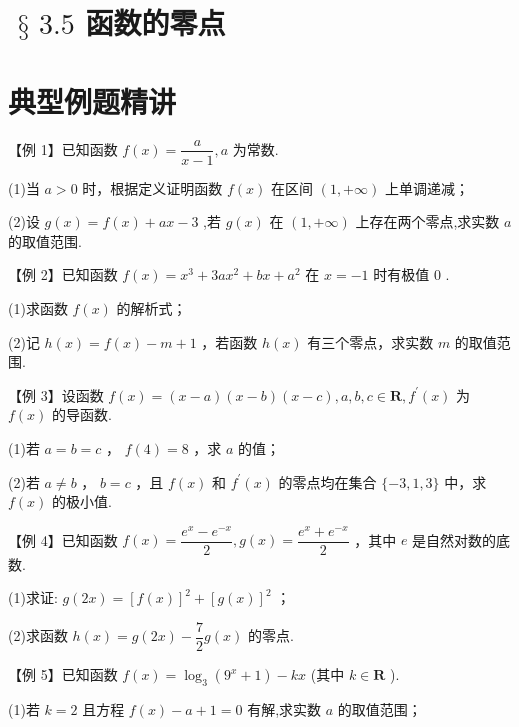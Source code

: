 \section*{$\text{ § }{3.5}$ 函数的零点}

\section*{典型例题精讲}

【例 1】已知函数 $f\left( x\right)  = \dfrac{a}{x - 1},a$ 为常数.

(1)当 $a > 0$ 时，根据定义证明函数 $f\left( x\right)$ 在区间 $\left( {1, + \infty }\right)$ 上单调递减；

(2)设 $g\left( x\right)  = f\left( x\right)  + {ax} - 3$ ,若 $g\left( x\right)$ 在 $\left( {1, + \infty }\right)$ 上存在两个零点,求实数 $a$ 的取值范围.

【例 2】已知函数 $f\left( x\right)  = {x}^{3} + {3a}{x}^{2} + {bx} + {a}^{2}$ 在 $x =  - 1$ 时有极值 0 .

(1)求函数 $f\left( x\right)$ 的解析式；

(2)记 $h\left( x\right)  = f\left( x\right)  - m + 1$ ，若函数 $h\left( x\right)$ 有三个零点，求实数 $m$ 的取值范围.

【例 3】设函数 $f\left( x\right)  = \left( {x - a}\right) \left( {x - b}\right) \left( {x - c}\right) ,a,b,c \in  \mathbf{R},{f}^{\prime }\left( x\right)$ 为 $f\left( x\right)$ 的导函数.

(1)若 $a = b = c$ ， $f\left( 4\right)  = 8$ ，求 $a$ 的值；

(2)若 $a \neq  b$ ， $b = c$ ，且 $f\left( x\right)$ 和 ${f}^{\prime }\left( x\right)$ 的零点均在集合 $\{  - 3,1,3\}$ 中，求 $f\left( x\right)$ 的极小值.

【例 4】已知函数 $f\left( x\right)  = \dfrac{{{e}}^{x} - {{e}}^{-x}}{2},g\left( x\right)  = \dfrac{{{e}}^{x} + {{e}}^{-x}}{2}$ ，其中 ${e}$ 是自然对数的底数.

(1)求证: $g\left( {2x}\right)  = {\left\lbrack  f\left( x\right) \right\rbrack  }^{2} + {\left\lbrack  g\left( x\right) \right\rbrack  }^{2}$ ；

(2)求函数 $h\left( x\right)  = g\left( {2x}\right)  - \dfrac{7}{2}g\left( x\right)$ 的零点.

【例 5】已知函数 $f\left( x\right)  = {\log }_{3}\left( {{9}^{x} + 1}\right)  - {kx}$ (其中 $k \in  \mathbf{R}$ ).

(1)若 $k = 2$ 且方程 $f\left( x\right)  - a + 1 = 0$ 有解,求实数 $a$ 的取值范围；

